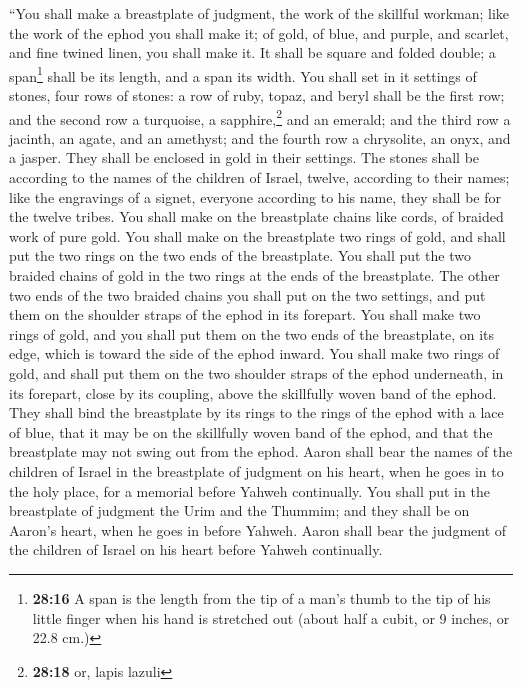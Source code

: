  ``You shall make a breastplate of judgment, the work of
the skillful workman; like the work of the ephod you shall make it; of
gold, of blue, and purple, and scarlet, and fine twined linen, you shall
make it.  It shall be square and folded double; a
span\footnote{\textbf{28:16} A span is the length from the tip of a
  man's thumb to the tip of his little finger when his hand is stretched
  out (about half a cubit, or 9 inches, or 22.8 cm.)} shall be its
length, and a span its width.  You shall set in it
settings of stones, four rows of stones: a row of ruby, topaz, and beryl
shall be the first row;  and the second row a turquoise,
a sapphire,\footnote{\textbf{28:18} or, lapis lazuli} and an emerald;
 and the third row a jacinth, an agate, and an amethyst;
 and the fourth row a chrysolite, an onyx, and a jasper.
They shall be enclosed in gold in their settings.  The
stones shall be according to the names of the children of Israel,
twelve, according to their names; like the engravings of a signet,
everyone according to his name, they shall be for the twelve tribes.
 You shall make on the breastplate chains like cords, of
braided work of pure gold.  You shall make on the
breastplate two rings of gold, and shall put the two rings on the two
ends of the breastplate.  You shall put the two braided
chains of gold in the two rings at the ends of the breastplate.
 The other two ends of the two braided chains you shall
put on the two settings, and put them on the shoulder straps of the
ephod in its forepart.  You shall make two rings of gold,
and you shall put them on the two ends of the breastplate, on its edge,
which is toward the side of the ephod inward.  You shall
make two rings of gold, and shall put them on the two shoulder straps of
the ephod underneath, in its forepart, close by its coupling, above the
skillfully woven band of the ephod.  They shall bind the
breastplate by its rings to the rings of the ephod with a lace of blue,
that it may be on the skillfully woven band of the ephod, and that the
breastplate may not swing out from the ephod.  Aaron
shall bear the names of the children of Israel in the breastplate of
judgment on his heart, when he goes in to the holy place, for a memorial
before Yahweh continually.  You shall put in the
breastplate of judgment the Urim and the Thummim; and they shall be on
Aaron's heart, when he goes in before Yahweh. Aaron shall bear the
judgment of the children of Israel on his heart before Yahweh
continually.

